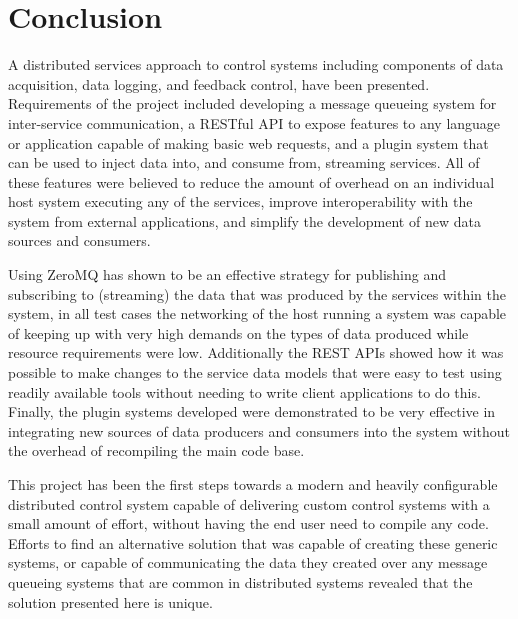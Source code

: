 \section{Conclusion}\label{sec:conclusion}

  A distributed services approach to control systems including components of
  data acquisition, data logging, and feedback control, have been presented.
  Requirements of the project included developing a message queueing system for
  inter-service communication, a RESTful API to expose features to any language
  or application capable of making basic web requests, and a plugin system that
  can be used to inject data into, and consume from, streaming services. All of
  these features were believed to reduce the amount of overhead on an
  individual host system executing any of the services, improve
  interoperability with the system from external applications, and simplify the
  development of new data sources and consumers.

  Using ZeroMQ has shown to be an effective strategy for publishing and
  subscribing to (streaming) the data that was produced by the services within
  the system, in all test cases the networking of the host running a system was
  capable of keeping up with very high demands on the types of data produced
  while resource requirements were low. Additionally the REST APIs showed how
  it was possible to make changes to the service data models that were easy
  to test using readily available tools without needing to write client
  applications to do this. Finally, the plugin systems developed were
  demonstrated to be very effective in integrating new sources of data
  producers and consumers into the system without the overhead of recompiling
  the main code base.

  This project has been the first steps towards a modern and heavily configurable distributed
  control system capable of delivering custom control systems with a small amount of effort,
  without having the end user need to compile any code. Efforts to find an alternative solution
  that was capable of creating these generic systems, or capable of communicating the data they
  created over any message queueing systems that are common in distributed systems revealed that
  the solution presented here is unique.
